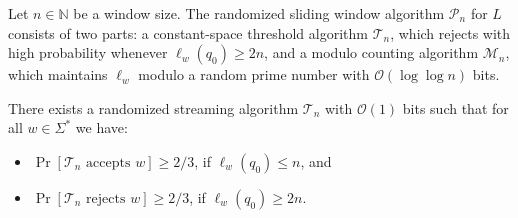 \documentclass{theoretics}
\newcommand{\N}{\mathbb{N}}
\newcommand{\M}{\mathcal{M}}
\renewcommand{\O}{\mathcal{O}}
\renewcommand{\P}{\mathcal{P}}
\renewcommand{\geq}{\geqslant}
\renewcommand{\leq}{\leqslant}
\renewcommand{\ge}{\geq}
\renewcommand{\le}{\leq}
\begin{document}
Let $n \in \N$ be a window size.
The randomized sliding window algorithm $\P_n$ for $L$ consists of two parts:
a constant-space threshold algorithm $\mathcal{T}_n$,
which rejects with high probability whenever $\ell_{w}(q_0) \geq 2n$,
and a modulo counting algorithm $\M_n$, which maintains $\ell_w$ modulo a random prime number
with $\O(\log \log n)$ bits.

\begin{lemma} \label{lemma-threshold}
	There exists a randomized streaming algorithm $\mathcal{T}_n$ with $\O(1)$ bits
	such that for all $w \in \Sigma^*$ we have:
	\begin{itemize}
		\item $\Pr[\mathcal{T}_n \text{ accepts } w] \ge 2/3$, if $\ell_w(q_0) \le n$, and
		\item $\Pr[\mathcal{T}_n \text{ rejects } w] \ge 2/3$, if $\ell_w(q_0) \ge 2n$.
	\end{itemize}
\end{lemma}
\end{document}
